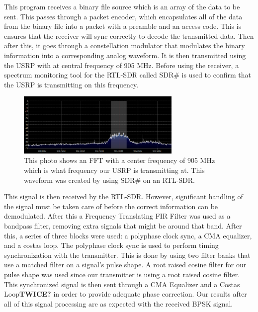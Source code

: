 This program receives a binary file source which is an array of the data to be sent. This passes through a packet encoder, which encapsulates all of the data from the binary file into a packet with a preamble and an access code.  This is ensures that the receiver will sync correctly to decode the transmitted data.  Then after this, it goes through a constellation modulator that modulates the binary information into a corresponding analog waveform. It is then transmitted using the USRP with at central frequency of 905 MHz.  Before using the receiver, a spectrum monitoring tool for the RTL-SDR called SDR\# is used to confirm that the USRP is transmitting on this frequency.

\begin{figure}[h]
  \centering
  \includegraphics[width=0.70\textwidth]{img/rxspectrum.PNG}
  \caption{This photo shows an FFT with a center frequency of 905 MHz which is what frequency our USRP is transmitting at.  This waveform was created by using SDR\# on an RTL-SDR.}
  \label{fig:rxspectrum}
\end{figure}

This signal is then received by the RTL-SDR.  However, significant handling of the signal must be taken care of before the correct information can be demodulated. After this a Frequency Translating FIR Filter was used as a bandpass filter, removing extra signals that might be around that band. After this, a series of three blocks were used: a polyphase clock sync, a CMA equalizer, and a costas loop. The polyphase clock sync is used to perform timing synchronization with the transmitter. This is done by using two filter banks that use a matched filter on a signal’s pulse shape.  A root raised cosine filter for our pulse shape was used since our transmitter is using a root raised cosine filter. This synchronized signal is then sent through a CMA Equalizer and a Costas Loop\textbf{TWICE?} in order to provide adequate phase correction.  Our results after all of this signal processing are as expected with the received BPSK signal. 

